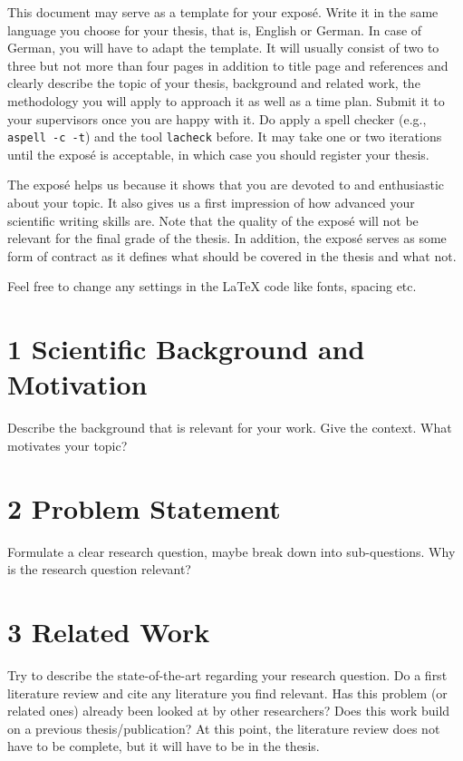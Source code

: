 \documentclass[a4paper,11pt]{article}
\begin{document}
This document may serve as a template for your exposé. Write it in the same language you choose for your thesis, that is, English or German. In case of German, you will have to adapt the template. It will usually consist of two to three but not more than four pages in addition to title page and references and clearly describe the topic of your thesis, background and related work, the methodology you will apply to approach it as well as a time plan. Submit it to your supervisors once you are happy with it. Do apply a spell checker (e.g., \texttt{aspell -c -t}) and the tool \texttt{lacheck} before. It may take one or two iterations until the exposé is acceptable, in which case you should register your thesis.

The exposé helps us because it shows that you are devoted to and enthusiastic about your topic. It also gives us a first impression of how advanced your scientific writing skills are. Note that the quality of the exposé will not be relevant for the final grade of the thesis. In addition, the exposé serves as some form of contract as it defines what should be covered in the thesis and what not.

Feel free to change any settings in the LaTeX code like fonts, spacing etc.

\section*{1 Scientific Background and Motivation}
Describe the background that is relevant for your work. Give the context. What motivates your topic?

\section*{2 Problem Statement}
Formulate a clear research question, maybe break down into sub-questions. Why is the research question relevant?

\section*{3 Related Work}
Try to describe the state-of-the-art regarding your research question. Do a first literature review and cite any literature you find relevant. Has this problem (or related ones) already been looked at by other researchers? Does this work build on a previous thesis/publication? At this point, the literature review does not have to be complete, but it will have to be in the thesis.
\end{document}
